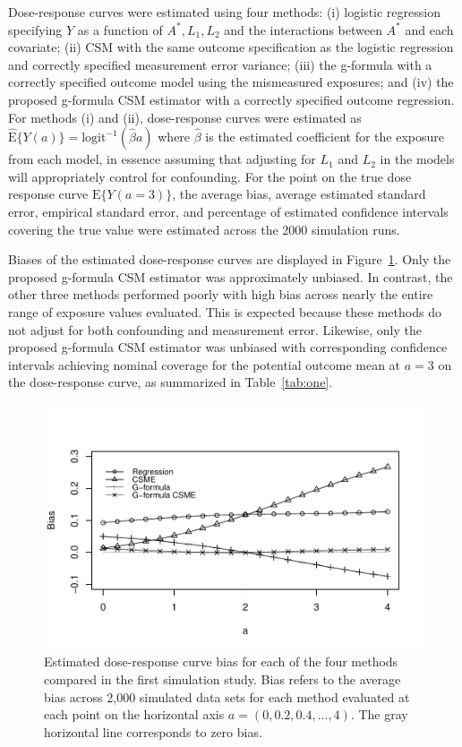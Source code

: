 \documentclass[useAMS,usenatbib,referee]{biom}
\begin{document}
Dose-response curves were estimated using four methods: (i) logistic regression specifying $Y$ as a function of $A^{*}, L_{1}, L_{2}$ and the interactions between $A^{*}$ and each covariate; (ii) CSM with the same outcome specification as the logistic regression and correctly specified measurement error variance; (iii) the g-formula with a correctly specified outcome model using the mismeasured exposures; and (iv) the proposed g-formula CSM estimator with a correctly specified outcome regression. For methods (i) and (ii), dose-response curves were estimated as $\hat{\text{E}}\{ Y(a) \} = \text{logit}^{-1}(\hat{\beta} a)$ where $\hat{\beta}$ is the estimated coefficient for the exposure from each model, in essence assuming that adjusting for $L_{1}$ and $L_{2}$ in the models will appropriately control for confounding. For the point on the true dose response curve $\text{E}\{ Y(a = 3) \}$, the average bias, average estimated standard error, empirical standard error, and percentage of estimated confidence intervals covering the true value were estimated across the 2000 simulation runs.

Biases of the estimated dose-response curves are displayed in Figure~\ref{fig:two}. Only the proposed g-formula CSM estimator was approximately unbiased. In contrast, the other three methods performed poorly with high bias across nearly the entire range of exposure values evaluated. This is expected because these methods do not adjust for both confounding and measurement error. Likewise, only the proposed g-formula CSM estimator was unbiased with corresponding confidence intervals achieving nominal coverage for the potential outcome mean at $a = 3$ on the dose-response curve, as summarized in Table~\ref{tab:one}.

\begin{figure}
\centering
\includegraphics[width=6in]{paper1-fig2-grey.pdf}
\caption{Estimated dose-response curve bias for each of the four methods compared in the first simulation study. Bias refers to the average bias across 2,000 simulated data sets for each method evaluated at each point on the horizontal axis $a = (0, 0.2, 0.4, ..., 4)$. The gray horizontal line corresponds to zero bias.}
\label{fig:two}
\end{figure}
\end{document}
